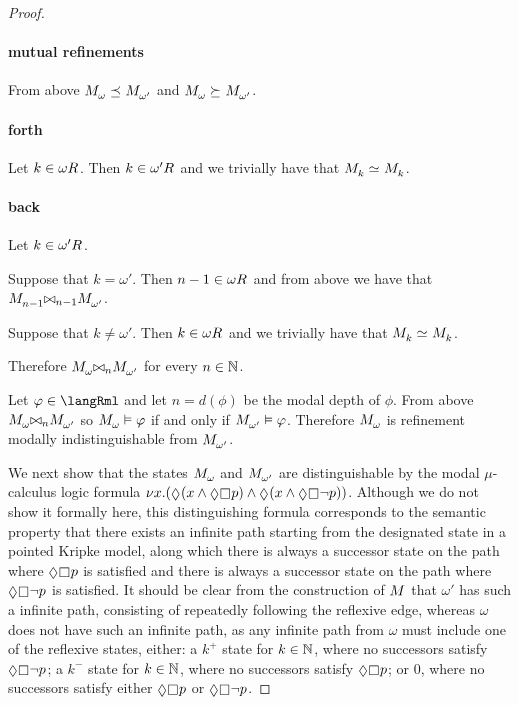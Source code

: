 \begin{proof}
\begin{enumerate}
    \paragraph{mutual refinements}

    From above $\kPModel{\omega} \refines \kPModel{\omega'}$ and  $\kPModel{\omega} \simulates \kPModel{\omega'}$.

    \paragraph{forth}

    Let $k \in \kSuccessors{}{\omega}$.
    Then $k \in \kSuccessors{}{\omega'}$ and we trivially have that $\kPModel{k} \bisimilar \kPModel{k}$.

    \paragraph{back}

    Let $k \in \kSuccessors{}{\omega'}$.

    Suppose that $k = \omega'$.
    Then $n - 1 \in \kSuccessors{}{\omega}$ and from above we have that $\kPModel{n - 1} \bisimref[n - 1] \kPModel{\omega'}$.

    Suppose that $k \neq \omega'$.
    Then $k \in \kSuccessors{}{\omega}$ and we trivially have that $\kPModel{k} \bisimilar \kPModel{k}$.
\end{enumerate}

Therefore $\kPModel{\omega} \bisimref[n] \kPModel{\omega'}$ for every $n \in \mathbb{N}$.

Let $\phi \in \langRml$ and let $n = d(\phi)$ be the modal depth of $\phi$.
From above $\kPModel{\omega} \bisimref[n] \kPModel{\omega'}$ so $\kPModel{\omega} \entails \phi$ if and only if $\kPModel{\omega'} \entails \phi$.
Therefore $\kPModel{\omega}$ is refinement modally indistinguishable from $\kPModel{\omega'}$.

We next show that the states $\kPModel{\omega}$ and $\kPModel{\omega'}$ are distinguishable by the modal $\mu$-calculus logic formula $\gfp{\varX} (\possible (\varX \land \possible \necessary \atomP) \land \possible (\varX \land \possible \necessary \neg \atomP))$.
Although we do not show it formally here, this distinguishing formula corresponds to the semantic property that there exists an infinite path starting from the designated state in a pointed Kripke model, along which there is always a successor state on the path where $\possible \necessary \atomP$ is satisfied and there is always a successor state on the path where $\possible \necessary \lnot \atomP$ is satisfied.
It should be clear from the construction of $\kModel$ that $\omega'$ has such a infinite path, consisting of repeatedly following the reflexive edge, whereas $\omega$ does not have such an infinite path, as any infinite path from $\omega$ must include one of the reflexive states, either: a $k^+$ state for $k \in \mathbb{N}$, where no successors satisfy $\possible \necessary \lnot \atomP$; a $k^-$ state for $k \in \mathbb{N}$, where no successors satisfy $\possible \necessary \atomP$; or $0$, where no successors satisfy either $\possible \necessary \atomP$ or $\possible \necessary \lnot \atomP$.


\end{proof}
